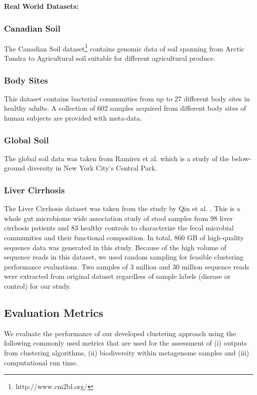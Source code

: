 \documentclass[10pt, conference, compsocconf]{IEEEtran}
\begin{document}
\textbf{Real World Datasets:}

\subsubsection{Canadian Soil}
The Canadian Soil dataset\footnote{http://www.cm2bl.org/} contains genomic data of soil spanning from Arctic Tundra to Agricultural soil 
suitable for different agricultural produce.  

\subsubsection{Body Sites}
This dataset contains bacterial communities from
up to 27 different body sites in healthy adults. A collection of 602 samples acquired from different body sites of human subjects are provided with meta-data.

\subsubsection{Global Soil}
The global soil data was taken from Ramirez et al. \cite{MARglobalSoil} which is a study of the 
below-ground diversity in New York City's Central Park.

\subsubsection{Liver Cirrhosis}
The Liver Cirrhosis dataset was taken from the study by Qin et al. \cite{qin2014alterations}. This is 
a whole gut microbiome wide association study of stool samples from 98 liver cirrhosis patients and 83 
healthy controls to characterize the fecal microbial communities and their functional composition. In total, 
860 GB of high-quality sequence data was 
generated in this study. Because of the high volume of sequence reads in this dataset, we used random sampling for 
feasible clustering performance evaluations. Two samples of 3 million and 30 million sequence reads were extracted 
from original dataset regardless of sample labels 
(disease or control) for our study.  


\subsection{\textbf{Evaluation Metrics}}

We evaluate the performance of our developed clustering approach using 
the following commonly used metrics that are used 
for the assessment of (i) outputs from clustering algorithms, (ii) biodiversity
within metagenome samples and (iii) computational run time. 
\end{document}
